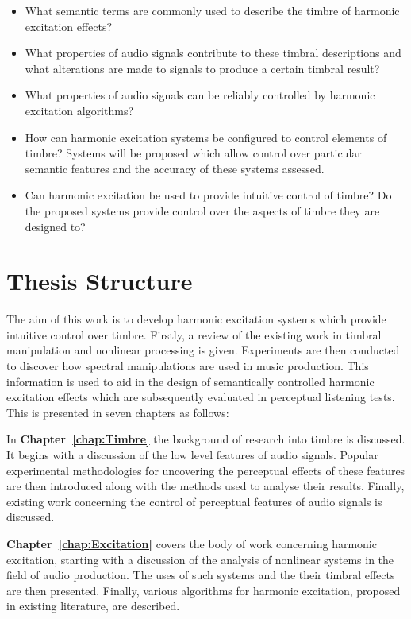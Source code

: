 	\begin{itemize}
		\item What semantic terms are commonly used to describe the timbre of harmonic excitation effects? 
		\item What properties of audio signals contribute to these timbral descriptions and what alterations are
		      made to signals to produce a certain timbral result?
		\item What properties of audio signals can be reliably controlled by harmonic excitation algorithms?
		\item How can harmonic excitation systems be configured to control elements of timbre? Systems will be
		      proposed which allow control over particular semantic features and the accuracy of these systems
		      assessed.
		\item Can harmonic excitation be used to provide intuitive control of timbre? Do the proposed systems
		      provide control over the aspects of timbre they are designed to?
	\end{itemize}

\section{Thesis Structure}
\label{sec:Introduction-ThesisStructure}
	The aim of this work is to develop harmonic excitation systems which provide intuitive control over timbre.
	Firstly, a review of the existing work in timbral manipulation and nonlinear processing is given. Experiments are
	then conducted to discover how spectral manipulations are used in music production. This information is used to aid
	in the design of semantically controlled harmonic excitation effects which are subsequently evaluated in perceptual
	listening tests. This is presented in seven chapters as follows:

	In {\bf{Chapter~\ref{chap:Timbre}}} the background of research into timbre is discussed. It begins with a discussion
	of the low level features of audio signals. Popular experimental methodologies for uncovering the perceptual effects
	of these features are then introduced along with the methods used to analyse their results. Finally, existing work
	concerning the control of perceptual features of audio signals is discussed.

	{\bf{Chapter~\ref{chap:Excitation}}} covers the body of work concerning harmonic excitation, starting with a
	discussion of the analysis of nonlinear systems in the field of audio production. The uses of such systems and the
	their timbral effects are then presented. Finally, various algorithms for harmonic excitation, proposed in existing
	literature, are described.


